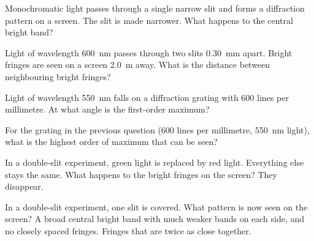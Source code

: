 
\begin{quizq}{}
Monochromatic light passes through a single narrow slit and forms a diffraction pattern on a screen.
The slit is made narrower. What happens to the central bright band?
\end{quizq}

\begin{quizq}{}
Light of wavelength \qty{600}{nm} passes through two slits \qty{0.30}{mm} apart. Bright fringes are seen
on a screen \qty{2.0}{m} away. What is the distance between neighbouring bright fringes?
\end{quizq}

\begin{quizq}{}
Light of wavelength \qty{550}{nm} falls on a diffraction grating with 600 lines per millimetre. At what
angle is the first-order maximum?
\end{quizq}

\begin{quizq}{}
For the grating in the previous question (600 lines per millimetre, \qty{550}{nm} light), what is the
highest order of maximum that can be seen?
\end{quizq}

\begin{quizq}{}
In a double-slit experiment, green light is replaced by red light. Everything else stays the same. What
happens to the bright fringes on the screen?
  {They disappear.}
\end{quizq}

\begin{quizq}{}
In a double-slit experiment, one slit is covered. What pattern is now seen on the screen?
  {A broad central bright band with much weaker bands on each side, and no closely spaced fringes.}
  {Fringes that are twice as close together.}
\end{quizq}

